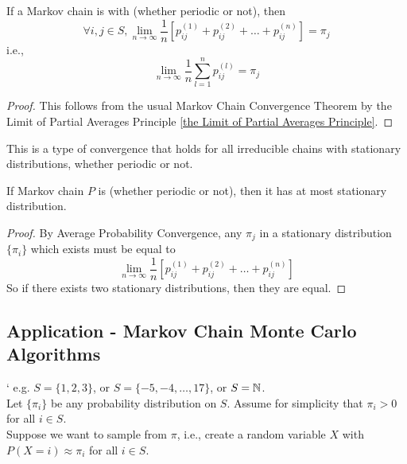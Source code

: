 \documentclass[11pt]{article}
\newcommand{\dur}[3]{{#1}_{#2}^{({#3})}}
\renewcommand{\limit}[1]{\underset{{#1} \rightarrow \infty}{\lim}}
\begin{document}
    If a Markov chain is  with  (whether periodic or not), then 
    $$\forall i, j \in S, \limit{n} \frac{1}{n}[\dur{p}{ij}{1} + \dur{p}{ij}{2} + \hdots + \dur{p}{ij}{n}] = \pi_j$$
    i.e.,
    $$\limit{n} \frac{1}{n}\sum_{l=1}^n \dur{p}{ij}{l} = \pi_j$$
    \begin{proof}
    	This follows from the usual Markov Chain Convergence Theorem by the Limit of Partial Averages Principle \ref{the Limit of Partial Averages Principle}.
    \end{proof}
    \remark
    This is a type of convergence that holds for all irreducible chains with stationary distributions, whether periodic or not.
    
     If Markov chain $P$ is  (whether periodic or not), then it has at most  stationary distribution.
    \begin{proof}
    	By Average Probability Convergence, any $\pi_j$ in a stationary distribution $\{\pi_i\}$ which exists must be equal to
    	$$\limit{n} \frac{1}{n}[\dur{p}{ij}{1} + \dur{p}{ij}{2} + \hdots + \dur{p}{ij}{n}]$$
    	So if there exists two stationary distributions, then they are equal.
    \end{proof}
    
    \subsection{Application - Markov Chain Monte Carlo Algorithms}
`    e.g. $S = \{1,2,3\}$, or $S = \{-5, -4, \hdots, 17\}$, or $S = \mathbb{N}$.\\
    Let $\{\pi_i\}$ be any probability distribution on $S$. Assume for simplicity that $\pi_i > 0$ for all $i \in S$.\\
    Suppose we want to sample from $\pi$, i.e., create a random variable $X$ with $P(X=i) \approx \pi_i$ for all $i \in S$.
\end{document}
